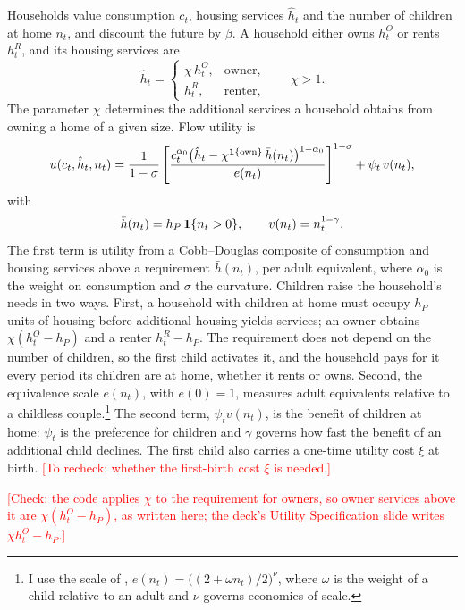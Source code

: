 Households value consumption $c_t$, housing services $\hat h_t$ and the
number of children at home $n_t$, and discount the future by $\beta$. A
household either owns $h^O_t$ or rents $h^R_t$, and its housing services are
\begin{equation*}
 \hat h_t=\begin{cases}\chi\,h^O_t, & \text{owner},\\ h^R_t, & \text{renter},\end{cases}
 \qquad \chi>1 .
\end{equation*}
The parameter $\chi$ determines the additional services a household obtains
from owning a home of a given size. Flow utility is
\begin{equation}
 u(c_t,\hat h_t,n_t)=\frac{1}{1-\sigma}\left[\frac{c_t^{\alpha_0}\bigl(\hat h_t-\chi^{\mathbf 1\{\text{own}\}}\,\bar h(n_t)\bigr)^{1-\alpha_0}}{e(n_t)}\right]^{1-\sigma}+\psi_t\,v(n_t),
 \label{eq:m-utility}
\end{equation}
with
\begin{equation*}
 \bar h(n_t)=h_P\,\mathbf 1\{n_t>0\},\qquad v(n_t)=n_t^{1-\gamma}.
\end{equation*}
The first term is utility from a Cobb--Douglas composite of consumption and
housing services above a requirement $\bar h(n_t)$, per adult equivalent,
where $\alpha_0$ is the weight on consumption and $\sigma$ the curvature.
Children raise the household's needs in two ways. First, a household with
children at home must occupy $h_P$ units of housing before additional housing
yields services; an owner obtains $\chi(h^O_t-h_P)$ and a renter $h^R_t-h_P$.
The requirement does not depend on the number of children, so the first
child activates it, and the household pays for it every period its children
are at home, whether it rents or owns. Second, the equivalence scale
$e(n_t)$, with $e(0)=1$, measures adult equivalents relative to a childless
couple.\footnote{I use the scale of
\citet{scholzSeshadriKhitatrakunSaving2006},
$e(n_t)=\bigl((2+\omega n_t)/2\bigr)^{\nu}$, where $\omega$ is the weight of
a child relative to an adult and $\nu$ governs economies of scale.} The second
term, $\psi_t v(n_t)$, is the benefit of children at home: $\psi_t$ is the
preference for children and $\gamma$ governs how fast the benefit of an
additional child declines. The first child also carries a one-time utility
cost $\xi$ at birth. \textcolor{red}{[To recheck: whether the first-birth
cost $\xi$ is needed.]}

\textcolor{red}{[Check: the code applies $\chi$ to the requirement for owners, so owner services above it are $\chi(h^O_t-h_P)$, as written here; the deck's Utility Specification slide writes $\chi h^O_t-h_P$.]}

